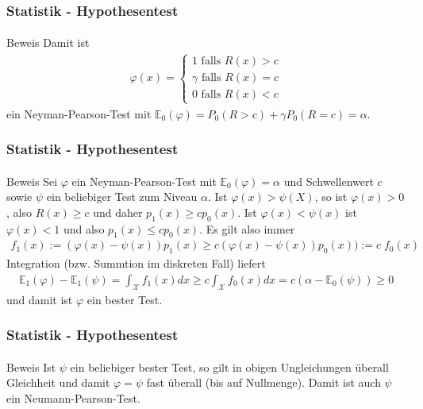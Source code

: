 \documentclass{beamer}
\begin{document}
\begin{frame}
    \frametitle{Statistik - Hypothesentest}
\framesubtitle{}
\begin{block}{Beweis}
Damit ist 
\begin{align*}
 \varphi(x) = \begin{cases} 1 \text{ falls } R(x) > c \\  \gamma  \text{ falls } R(x) = c \\ 0 \text{ falls } R(x) < c  \end{cases}
\end{align*}
ein Neyman-Pearson-Test mit $\mathbb{E}_0(\varphi) = P_0(R > c) + \gamma P_0(R=c) = \alpha$.
\end{block}

 \end{frame}



\begin{frame}
    \frametitle{Statistik - Hypothesentest}
\framesubtitle{}
\begin{block}{Beweis}
Sei $\varphi$ ein Neyman-Pearson-Test  mit $\mathbb{E}_0(\varphi) = \alpha$ und Schwellenwert $c$ sowie $\psi$ ein beliebiger Test zum Niveau $\alpha$. Ist $\varphi(x) > \psi(X)$, so ist $\varphi(x) > 0$, also $R(x) \geq c$ und daher $p_1(x) \geq c p_0(x)$. Ist $\varphi(x) < \psi(x)$ ist $\varphi(x) <1$ und also $p_1(x) \leq c p_0(x)$. Es gilt also immer
\begin{align*}
f_1(x) := (\varphi(x) - \psi(x))p_1(x) \geq c ( \varphi(x) - \psi(x))p_0(x) ) := c \; f_0(x)
\end{align*}
Integration (bzw. Summtion im diskreten Fall) liefert
\begin{align*}
\mathbb{E}_1(\varphi) - \mathbb{E}_1(\psi) = \int_{\mathcal{X}} f_1(x) dx \geq c   \int_{\mathcal{X}} f_0(x) dx = c(\alpha -  \mathbb{E}_0(\psi)  ) \geq 0
\end{align*}
und damit ist $\varphi$ ein bester Test.
\end{block}

 \end{frame}

\begin{frame}
    \frametitle{Statistik - Hypothesentest}
\framesubtitle{}
\begin{block}{Beweis}
Ist  $\psi$ ein beliebiger bester Test, so gilt in obigen Ungleichungen überall Gleichheit und damit $\varphi = \psi$ fast überall (bis auf Nullmenge). Damit ist auch $\psi$ ein Neumann-Pearson-Test.
\end{block}

 \end{frame}
\end{document}
